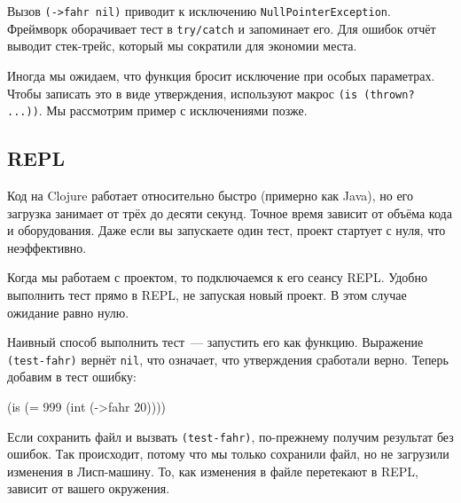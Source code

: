 \begin{english}
\end{english}

\fi


Вызов \verb|(->fahr nil)| приводит к исключению
\texttt{Null\-Pointer\-Exception}. Фреймворк оборачивает тест в \verb|try/catch|
и запоминает его. Для ошибок отчёт выводит стек-трейс, который мы сократили для
экономии места.

Иногда мы ожидаем, что функция бросит исключение при особых параметрах. Чтобы
записать это в виде утверждения, используют макрос \verb|(is (thrown? ...))|. Мы
рассмотрим пример с исключениями позже.

\subsection{REPL}


Код на Clojure работает относительно быстро (примерно как Java), но его загрузка
занимает от трёх до десяти секунд. Точное время зависит от объёма кода и
оборудования. Даже если вы запускаете один тест, проект стартует с нуля, что
неэффективно.

Когда мы работаем с проектом, то подключаемся к его сеансу REPL. Удобно
выполнить тест прямо в REPL, не запуская новый проект. В этом случае ожидание
равно нулю.

Наивный способ выполнить тест~--- запустить его как функцию. Выражение
\verb|(test-fahr)| вернёт \verb|nil|, что означает, что утверждения
сработали верно. Теперь добавим в тест ошибку:

\begin{english}
  \begin{clojure}
(is (= 999 (int (->fahr 20))))
  \end{clojure}
\end{english}

Если сохранить файл и вызвать \verb|(test-fahr)|, по-прежнему получим результат
без ошибок. Так происходит, потому что мы только сохранили файл, но не загрузили
изменения в Лисп-машину. То, как изменения в файле перетекают в REPL, зависит от
вашего окружения.

